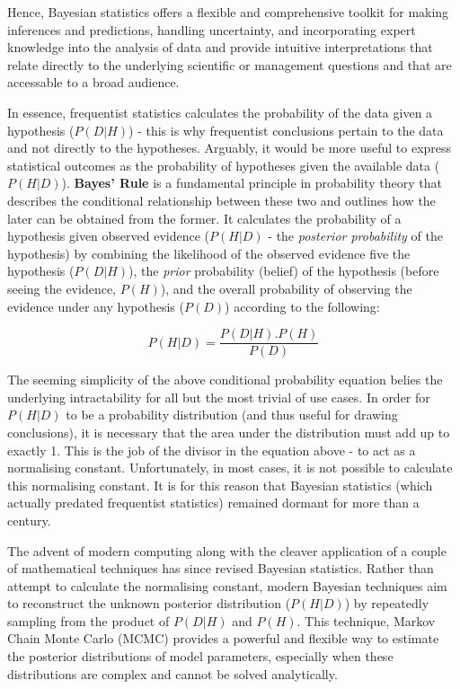 \documentclass[
  8pt,
  a4paper]{article}
\begin{document}
\begin{tcolorbox}
Hence, Bayesian statistics offers a flexible and comprehensive toolkit
for making inferences and predictions, handling uncertainty, and
incorporating expert knowledge into the analysis of data and provide
intuitive interpretations that relate directly to the underlying
scientific or management questions and that are accessable to a broad
audience.

In essence, frequentist statistics calculates the probability of the
data given a hypothesis (\(P(D|H)\)) - this is why frequentist
conclusions pertain to the data and not directly to the hypotheses.
Arguably, it would be more useful to express statistical outcomes as the
probability of hypotheses given the available data (\(P(H|D)\)).
\textbf{Bayes' Rule} is a fundamental principle in probability theory
that describes the conditional relationship between these two and
outlines how the later can be obtained from the former. It calculates
the probability of a hypothesis given observed evidence (\(P(H|D)\) -
the \emph{posterior probability} of the hypothesis) by combining the
likelihood of the observed evidence five the hypothesis (\(P(D|H)\)),
the \emph{prior} probability (belief) of the hypothesis (before seeing
the evidence, \(P(H)\)), and the overall probability of observing the
evidence under any hypothesis (\(P(D)\)) according to the following:

\[
P(H|D) = \frac{P(D|H).P(H)}{P(D)}
\]

The seeming simplicity of the above conditional probability equation
belies the underlying intractability for all but the most trivial of use
cases. In order for \(P(H|D)\) to be a probability distribution (and
thus useful for drawing conclusions), it is necessary that the area
under the distribution must add up to exactly 1. This is the job of the
divisor in the equation above - to act as a normalising constant.
Unfortunately, in most cases, it is not possible to calculate this
normalising constant. It is for this reason that Bayesian statistics
(which actually predated frequentist statistics) remained dormant for
more than a century.

The advent of modern computing along with the cleaver application of a
couple of mathematical techniques has since revised Bayesian statistics.
Rather than attempt to calculate the normalising constant, modern
Bayesian techniques aim to reconstruct the unknown posterior
distribution (\(P(H|D)\)) by repeatedly sampling from the product of
\(P(D|H)\) and \(P(H)\). This technique, Markov Chain Monte Carlo (MCMC)
provides a powerful and flexible way to estimate the posterior
distributions of model parameters, especially when these distributions
are complex and cannot be solved analytically.


\end{tcolorbox}
\end{document}
